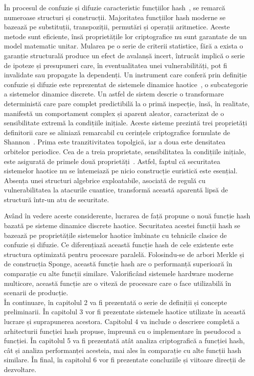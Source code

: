 În procesul de confuzie și difuzie caracteristic funcțiilor hash~\cite{shannon1949}, se remarcă numeroase structuri și construcții.
Majoritatea funcțiilor hash moderne se bazează pe substituții, transpoziții, permutări și operații aritmetice.
Aceste metode sunt eficiente, însă proprietățile lor criptografice nu sunt garantate de un model matematic unitar.
Mularea pe o serie de criterii statistice, fără a exista o garanție structurală produce un efect de avalanșă incert, întrucât implică o serie de ipoteze și presupuneri care, în eventualitatea unei vulnerabilități, pot fi invalidate sau propagate la dependenți.
Un instrument care conferă prin definiție confuzie și difuzie este reprezentat de sistemele dinamice haotice~\cite{alvarez2006}, o subcategorie a sistemelor dinamice discrete.
Un astfel de sistem descrie o transformare deterministă care pare complet predictibilă la o primă inspecție, însă, în realitate, manifestă un comportament complex și aparent aleator, caracterizat de o sensibilitate extremă la condițiile inițiale.
Aceste sisteme prezintă trei proprietăți definitorii care se aliniază remarcabil cu cerințele criptografice formulate de Shannon~\cite{shannon1949,devaney1989,alvarez2006}.
Prima este tranzitivitatea topolgică, iar a doua este densitatea orbitelor periodice.
Cea de a treia proprietate, sensibilitatea la condițiile inițiale, este asigurată de primele două proprietăți~\cite{banks1992}.
Astfel, faptul că securitatea sistemelor haotice nu se întemeiază pe nicio construcție euristică este esențial.
Absența unei structuri algebrice exploatabile, asociată de regulă cu vulnerabilitatea la atacurile cuantice, transformă această aparentă lipsă de structură într-un atu de securitate.

Având în vedere aceste considerente, lucrarea de față propune o nouă funcție hash bazată pe sisteme dinamice discrete haotice.
Securitatea acestei funcții hash se bazează pe proprietățile sistemelor haotice îmbinate cu tehnicile clasice de confuzie și difuzie.
Ce diferențiază această funcție hash de cele existente este structura optimizată pentru procesare paralelă.
Folosindu-se de arbori Merkle și de construcția Sponge, această funcție hash are o performanță superioară în comparație cu alte funcții similare.
Valorificând sistemele hardware moderne multicore, această funcție are o viteză de procesare care o face utilizabilă în scenarii de producție. \\

În continuare, în capitolul 2 va fi prezentată o serie de definiții și concepte preliminarii.
În capitolul 3 vor fi prezentate sistemele haotice utilizate în această lucrare și suprapunerea acestora.
Capitolul 4 va include o descriere completă a arhitecturii funcției hash propuse, împreună cu o implementare în pseudocod a funcției.
În capitolul 5 va fi prezentată atât analiza criptografică a funcției hash, cât și analiza performanței acesteia, mai ales în comparație cu alte funcții hash similare.
În final, în capitolul 6 vor fi prezentate concluziile și viitoare direcții de dezvoltare.